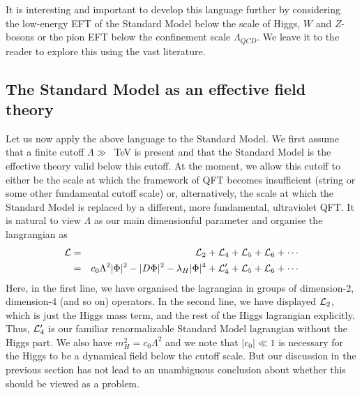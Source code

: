 \documentclass[12pt]{article}
\newcommand{\bea}{\begin{eqnarray}}
\newcommand{\eea}{\end{eqnarray}}
\numberwithin{equation}{section}
\begin{document}
It is interesting and important to develop this language further by considering the low-energy EFT of the Standard Model below the scale of Higgs, $W$ and $Z$-bosons or the pion EFT below the confinement scale $\Lambda_{QCD}$. We leave it to the reader to explore this using the vast literature.






\subsection{The Standard Model as an effective field theory}

Let us now apply the above language to the Standard Model. We first assume that a finite cutoff $\Lambda\gg$~TeV is present and that the Standard Model is the effective theory valid below this cutoff. At the moment, we allow this cutoff to either be the scale at which the framework of QFT becomes insufficient (string or some other fundamental cutoff scale) or, alternatively, the scale at which the Standard Model is replaced by a different, more fundamental, ultraviolet QFT. It is natural to view $\Lambda$ as our main dimensionful parameter and organise the langrangian as
\bea
{\cal L} &=& {\cal L}_2+{\cal L}_4+ {\cal L}_5 + {\cal L}_6 +\cdots
\\
&=&c_0\Lambda^2|\Phi|^2-|D\Phi|^2-\lambda_H|\Phi|^4+ {\cal L}_4'+{\cal L}_5 + {\cal L}_6 +\cdots
\eea
Here, in the first line, we have organised the lagrangian in groups of dimension-2, dimension-4 (and so on) operators.
In the second line, we have displayed ${\cal L}_2$, which is just the Higgs mass term, and the rest of the Higgs lagrangian explicitly. Thus, ${\cal L}_4'$ is our familiar renormalizable Standard Model lagrangian without the Higgs part. We also have $m_H^2=c_0\Lambda^2$ and we note that $|c_0|\ll 1$ is necessary for the Higgs to be a dynamical field below the cutoff scale. But our discussion in the previous section has not lead to an unambiguous conclusion about whether this should be viewed as a problem. 
\end{document}
